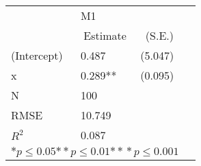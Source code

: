 \begin{tabular}{@{}l*{3}{l}@{}}
\hline
  &\multicolumn{2}{l}{M1  }\tabularnewline
 &\multicolumn{1}{c}{Estimate}&\multicolumn{1}{c}{(S.E.)}\tabularnewline
 \hline
 \hline
  (Intercept) & 0.487 & (5.047) \tabularnewline
  x & 0.289** & (0.095) \tabularnewline
 \hline
 N&\multicolumn{1}{l}{100}  & \tabularnewline
 RMSE&10.749\tabularnewline
 $R^2$&0.087\tabularnewline
 \hline
\hline
 
 \multicolumn{3}{l}{  ${*  p}\le 0.05$${*\!\!*  p}\le 0.01$${*\!\!*\!\!*  p}\le 0.001$}\tabularnewline
 \end{tabular}